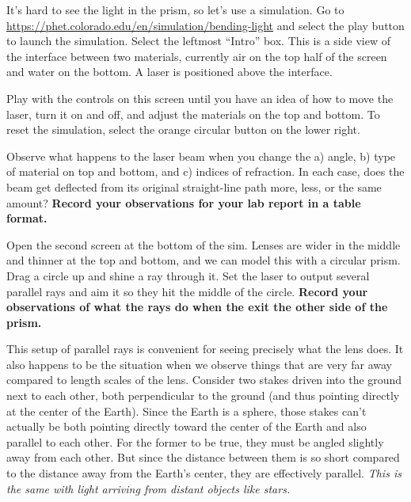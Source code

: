 \begin{steps}
	\item It's hard to see the light in the prism, so let's use a simulation. Go to \url{https://phet.colorado.edu/en/simulation/bending-light} and select the play button to launch the simulation. Select the leftmost ``Intro'' box. This is a side view of the interface between two materials, currently air on the top half of the screen and water on the bottom. A laser is positioned above the interface.
	
	\item Play with the controls on this screen until you have an idea of how to move the laser, turn it on and off, and adjust the materials on the top and bottom. To reset the simulation, select the orange circular button on the lower right.
	
	\item Observe what happens to the laser beam when you change the a) angle, b) type of material on top and bottom, and c) indices of refraction. In each case, does the beam get deflected from its original straight-line path more, less, or the same amount? \textbf{Record your observations for your lab report in a table format.}

	\item Open the second screen at the bottom of the sim. Lenses are wider in the middle and thinner at the top and bottom, and we can model this with a circular prism. Drag a circle up and shine a ray through it. Set the laser to output several parallel rays and aim it so they hit the middle of the circle. \textbf{Record your observations of what the rays do when the exit the other side of the prism.}
	
\end{steps}

This setup of parallel rays is convenient for seeing precisely what the lens does. It also happens to be the situation when we observe things that are very far away compared to length scales of the lens. Consider two stakes driven into the ground next to each other, both perpendicular to the ground (and thus pointing directly at the center of the Earth). Since the Earth is a sphere, those stakes can't actually be both pointing directly toward the center of the Earth and also parallel to each other. For the former to be true, they must be angled slightly away from each other. But since the distance between them is so short compared to the distance away from the Earth's center, they are effectively parallel. \textit{This is the same with light arriving from distant objects like stars.}

